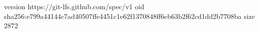 version https://git-lfs.github.com/spec/v1
oid sha256:e799a44144c7ad40507ffe4451c1e62f1370848ff6eb63b2f62cd1dd2b7708ba
size 2872

